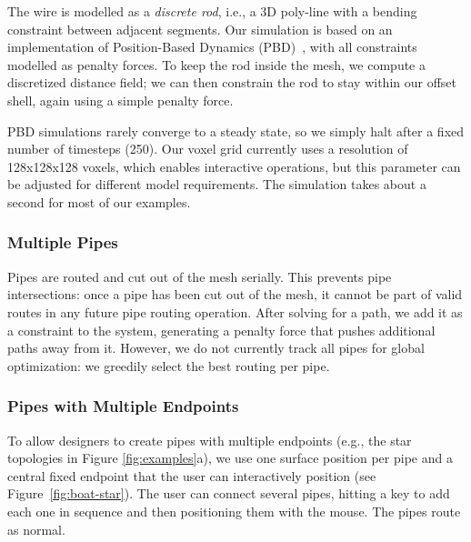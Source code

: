 The wire is modelled as a \emph{discrete rod}, i.e., a 3D poly-line with a bending 
constraint between adjacent segments. Our simulation is based on an
implementation of Position-Based Dynamics (PBD)~\cite{Muller07}, with all constraints
modelled as penalty forces. To keep the rod inside the
mesh, we compute a discretized distance field; we can then constrain the
rod to stay within our offset shell, again using a simple penalty force.


PBD simulations rarely converge to a steady state, so we simply halt after a fixed number of timesteps (250). Our voxel grid currently uses a resolution of 128x128x128 voxels, which enables interactive operations, but this parameter can be adjusted for different model requirements. The simulation takes about a second for most of our examples.

\subsubsection{Multiple Pipes}
Pipes are routed and cut out of the mesh serially. This prevents pipe intersections: once a pipe has been cut out of the mesh, it cannot be part of valid routes in any future pipe routing operation. After solving for a path, we add it as a constraint to the system, generating
a penalty force that pushes additional paths away from it.  However, we do not currently track all pipes for global optimization: we greedily select the best routing per pipe. 

\subsubsection{Pipes with Multiple Endpoints}
To allow designers to create pipes with multiple endpoints (e.g., the star topologies in Figure \ref{fig:examples}a), we use one surface position per pipe and a central fixed endpoint that the user can interactively position (see Figure~\ref{fig:boat-star}).  The user can connect several pipes, hitting a key to add each one in sequence and then positioning them with the mouse.  The pipes route as normal.

